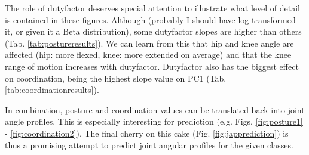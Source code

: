 The role of dutyfactor deserves special attention to illustrate what level of detail is contained in these figures.
Although  (probably I should have log transformed it, or given it a Beta distribution), some dutyfactor slopes are higher than others (Tab. \ref{tab:postureresults}).
We can learn from this that hip and knee angle are affected (hip: more flexed, knee: more extended on average) and that the knee range of motion increases with dutyfactor.
Dutyfactor also has the biggest effect on coordination, being the highest slope value on PC1 (Tab. \ref{tab:coordinationresults}).


In combination, posture and coordination values can be translated back into joint angle profiles.
This is especially interesting for prediction (e.g. Figs. \ref{fig:posture1} - \ref{fig:coordination2}).
The final cherry on this cake (Fig. \ref{fig:japprediction}) is thus a promising attempt to predict joint angular profiles for the given classes.

